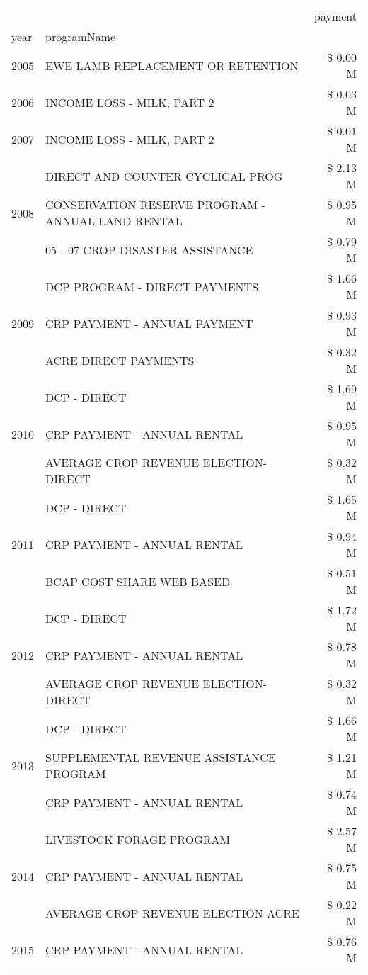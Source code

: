 \begin{tabular}{llr}
\toprule
 &  & payment \\
year & programName &  \\
\midrule
2005 & EWE LAMB REPLACEMENT OR RETENTION & \$ 0.00 M \\
\cline{1-3}
2006 & INCOME LOSS - MILK, PART 2 & \$ 0.03 M \\
\cline{1-3}
2007 & INCOME LOSS - MILK, PART 2 & \$ 0.01 M \\
\cline{1-3}
\multirow[t]{3}{*}{2008} & DIRECT AND COUNTER CYCLICAL PROG & \$ 2.13 M \\
 & CONSERVATION RESERVE PROGRAM - ANNUAL LAND RENTAL & \$ 0.95 M \\
 & 05 - 07 CROP DISASTER ASSISTANCE & \$ 0.79 M \\
\cline{1-3}
\multirow[t]{3}{*}{2009} & DCP PROGRAM - DIRECT PAYMENTS & \$ 1.66 M \\
 & CRP PAYMENT - ANNUAL PAYMENT & \$ 0.93 M \\
 & ACRE DIRECT PAYMENTS & \$ 0.32 M \\
\cline{1-3}
\multirow[t]{3}{*}{2010} & DCP - DIRECT & \$ 1.69 M \\
 & CRP PAYMENT - ANNUAL RENTAL & \$ 0.95 M \\
 & AVERAGE CROP REVENUE ELECTION-DIRECT & \$ 0.32 M \\
\cline{1-3}
\multirow[t]{3}{*}{2011} & DCP - DIRECT & \$ 1.65 M \\
 & CRP PAYMENT - ANNUAL RENTAL & \$ 0.94 M \\
 & BCAP COST SHARE WEB BASED & \$ 0.51 M \\
\cline{1-3}
\multirow[t]{3}{*}{2012} & DCP - DIRECT & \$ 1.72 M \\
 & CRP PAYMENT - ANNUAL RENTAL & \$ 0.78 M \\
 & AVERAGE CROP REVENUE ELECTION-DIRECT & \$ 0.32 M \\
\cline{1-3}
\multirow[t]{3}{*}{2013} & DCP - DIRECT & \$ 1.66 M \\
 & SUPPLEMENTAL REVENUE ASSISTANCE PROGRAM & \$ 1.21 M \\
 & CRP PAYMENT - ANNUAL RENTAL & \$ 0.74 M \\
\cline{1-3}
\multirow[t]{3}{*}{2014} & LIVESTOCK FORAGE PROGRAM & \$ 2.57 M \\
 & CRP PAYMENT - ANNUAL RENTAL & \$ 0.75 M \\
 & AVERAGE CROP REVENUE ELECTION-ACRE & \$ 0.22 M \\
\cline{1-3}
\multirow[t]{3}{*}{2015} & CRP PAYMENT - ANNUAL RENTAL & \$ 0.76 M \\

\end{tabular}
